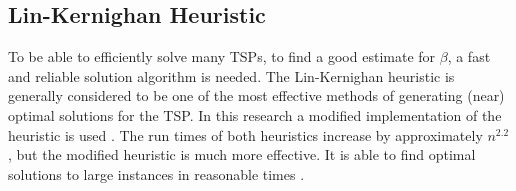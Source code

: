 \subsection{Lin-Kernighan Heuristic}
To be able to efficiently solve many TSPs, to find a good estimate for $\beta$, a fast and reliable solution algorithm is needed.
The Lin-Kernighan heuristic \citep{lin1973effective} is generally considered to be one of the most effective methods of generating (near) optimal solutions for the TSP.
In this research a modified implementation of the heuristic is used \citep{helsgaun2000effective}.
The run times of both heuristics increase by approximately $n^{2.2}$, but the modified heuristic is much more effective.
It is able to find optimal solutions to large instances in reasonable times \citep{helsgaun2000effective}.
